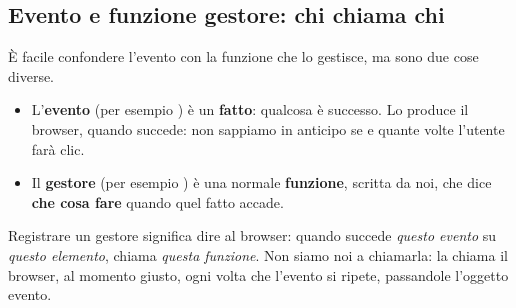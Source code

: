 \subsection{Evento e funzione gestore: chi chiama chi}

È facile confondere l'evento con la funzione che lo gestisce, ma sono due cose
diverse.

\begin{itemize}
  \item L'\textbf{evento} (per esempio ) è un \textbf{fatto}:
        qualcosa è successo. Lo produce il browser, quando succede: non sappiamo
        in anticipo se e quante volte l'utente farà clic.
  \item Il \textbf{gestore} (per esempio ) è una normale
        \textbf{funzione}, scritta da noi, che dice \textbf{che cosa fare}
        quando quel fatto accade.
\end{itemize}

Registrare un gestore significa dire al browser: \guillemotleft quando succede
\textit{questo evento} su \textit{questo elemento}, chiama \textit{questa
funzione}\guillemotright. Non siamo noi a chiamarla: la chiama il browser, al
momento giusto, ogni volta che l'evento si ripete, passandole l'oggetto evento.

